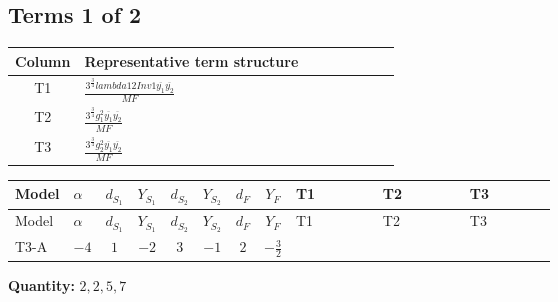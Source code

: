 \documentclass[8pt]{article}
\begin{document}
\begin{landscape}
\subsection*{Terms 1 of 2}
\begin{center}
\begin{tabular}{@{}c >{\raggedright\arraybackslash}p{0.82\linewidth}@{}}
\toprule
Column & Representative term structure \\
\midrule
T1 & \(\displaystyle \frac{3^{\frac{3}{4}} lambda12Inv1 \overline{y_{1}} \overline{y_{2}}}{MF}\) \\
\midrule
T2 & \(\displaystyle \frac{3^{\frac{3}{4}} g_{1}^{2} \overline{y_{1}} \overline{y_{2}}}{MF}\) \\
\midrule
T3 & \(\displaystyle \frac{3^{\frac{3}{4}} g_{2}^{2} \overline{y_{1}} \overline{y_{2}}}{MF}\) \\
\midrule
\bottomrule
\end{tabular}
\end{center}
\smallskip
\tiny
\begin{longtable}{@{}llcccccc >{\raggedright\arraybackslash}p{0.21\linewidth} >{\raggedright\arraybackslash}p{0.21\linewidth} >{\raggedright\arraybackslash}p{0.21\linewidth}@{}}
\toprule
Model & $\alpha$ & $d_{S_1}$ & $Y_{S_1}$ & $d_{S_2}$ & $Y_{S_2}$ & $d_F$ & $Y_F$ & T1 & T2 & T3 \\
\midrule
\endfirsthead
\toprule
Model & $\alpha$ & $d_{S_1}$ & $Y_{S_1}$ & $d_{S_2}$ & $Y_{S_2}$ & $d_F$ & $Y_F$ & T1 & T2 & T3 \\
\midrule
\endhead
T3-A & $-4$ & $1$ & $-2$ & $3$ & $-1$ & $2$ & $-\frac{3}{2}$ & \scriptsize\adjustbox{max width=\linewidth}{$\begin{gathered} \frac{3^{\frac{3}{4}} lambda12Inv1 \overline{y_{1}} \overline{y_{2}}}{6 MF}\end{gathered}$} & \scriptsize\adjustbox{max width=\linewidth}{$\begin{gathered} \frac{9 \cdot 3^{\frac{3}{4}} g_{1}^{2} \overline{y_{1}} \overline{y_{2}}}{8 MF}\end{gathered}$} & \scriptsize\adjustbox{max width=\linewidth}{$\begin{gathered} \frac{17 \cdot 3^{\frac{3}{4}} g_{2}^{2} \overline{y_{1}} \overline{y_{2}}}{24 MF}\end{gathered}$} \\
\midrule
\bottomrule
\end{longtable}
\clearpage
\noindent\textbf{Quantity: }$\mathrm{2,2,5,7}$\par\smallskip

\end{landscape}
\end{document}
